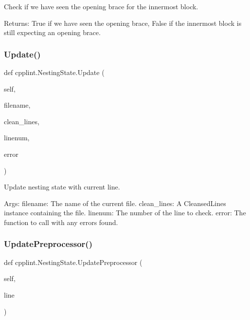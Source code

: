 \begin{DoxyVerb}Check if we have seen the opening brace for the innermost block.

Returns:
  True if we have seen the opening brace, False if the innermost
  block is still expecting an opening brace.
\end{DoxyVerb}
 \mbox{\label{classcpplint_1_1NestingState_a3adead8c1575b98ace5c5230f3772c1e}} 
\subsubsection{\texorpdfstring{Update()}{Update()}}
{\footnotesize\ttfamily def cpplint.\+Nesting\+State.\+Update (\begin{DoxyParamCaption}\item[{}]{self,  }\item[{}]{filename,  }\item[{}]{clean\+\_\+lines,  }\item[{}]{linenum,  }\item[{}]{error }\end{DoxyParamCaption})}

\begin{DoxyVerb}Update nesting state with current line.

Args:
  filename: The name of the current file.
  clean_lines: A CleansedLines instance containing the file.
  linenum: The number of the line to check.
  error: The function to call with any errors found.
\end{DoxyVerb}
 \mbox{\label{classcpplint_1_1NestingState_ac3d509c536af445e8ab6b17b067b53f1}} 
\subsubsection{\texorpdfstring{Update\+Preprocessor()}{UpdatePreprocessor()}}
{\footnotesize\ttfamily def cpplint.\+Nesting\+State.\+Update\+Preprocessor (\begin{DoxyParamCaption}\item[{}]{self,  }\item[{}]{line }\end{DoxyParamCaption})}

